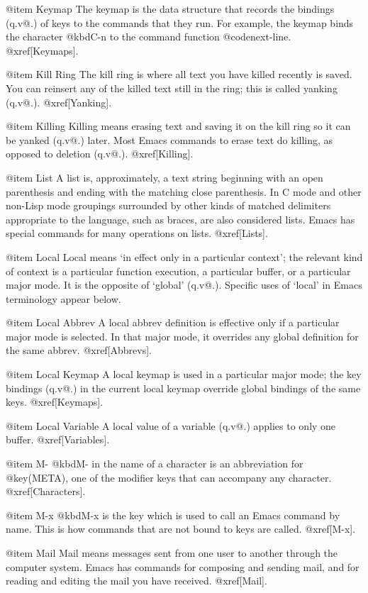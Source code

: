 @item Keymap
The keymap is the data structure that records the bindings (q.v@.)  of
keys to the commands that they run.  For example, the keymap binds
the character @kbd{C-n} to the command function @code{next-line}.
@xref[Keymaps].

@item Kill Ring
The kill ring is where all text you have killed recently is saved.
You can reinsert any of the killed text still in the ring; this is called
yanking (q.v@.).  @xref[Yanking].

@item Killing
Killing means erasing text and saving it on the kill ring so it can be
yanked (q.v@.) later.  Most Emacs commands to erase text do killing, as
opposed to deletion (q.v@.).  @xref[Killing].

@item List
A list is, approximately, a text string beginning with an open
parenthesis and ending with the matching close parenthesis.  In C mode
and other non-Lisp mode groupings surrounded by other kinds of matched
delimiters appropriate to the language, such as braces, are also
considered lists.  Emacs has special commands for many operations on
lists.  @xref[Lists].

@item Local
Local means `in effect only in a particular context'; the relevant kind of
context is a particular function execution, a particular buffer, or a
particular major mode.  It is the opposite of `global' (q.v@.).  Specific
uses of `local' in Emacs terminology appear below.

@item Local Abbrev
A local abbrev definition is effective only if a particular major mode is
selected.  In that major mode, it overrides any global definition for the
same abbrev.  @xref[Abbrevs].

@item Local Keymap
A local keymap is used in a particular major mode; the key bindings (q.v@.)
in the current local keymap override global bindings of the same keys.
@xref[Keymaps].

@item Local Variable
A local value of a variable (q.v@.) applies to only one buffer.
@xref[Variables].

@item M-
@kbd{M-} in the name of a character is an abbreviation for @key(META),
one of the modifier keys that can accompany any character.
@xref[Characters].

@item M-x
@kbd{M-x} is the key which is used to call an Emacs command by name.
This is how commands that are not bound to keys are called.  @xref[M-x].

@item Mail
Mail means messages sent from one user to another through the computer
system.  Emacs has commands for composing and sending mail, and for reading
and editing the mail you have received.  @xref[Mail].

